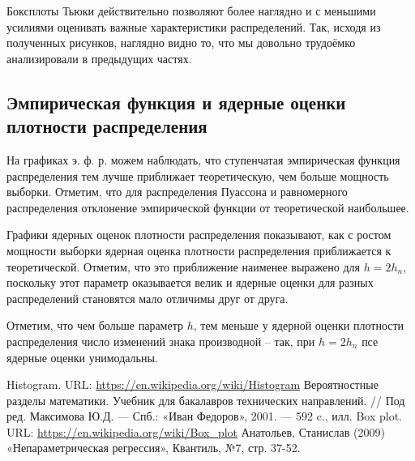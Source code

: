 \documentclass[12pt]{article}
\begin{document}
	Боксплоты Тьюки действительно позволяют более наглядно и с меньшими усилиями оценивать важные характеристики распределений. Так, исходя из полученных рисунков, наглядно видно то, что мы довольно трудоёмко анализировали в предыдущих частях.

	
	\subsection{Эмпирическая функция и ядерные оценки плотности распределения}
	
	На графиках э. ф. р. можем наблюдать, что ступенчатая эмпирическая функция распределения тем лучше приближает теоретическую, чем больше мощность выборки. Отметим, что для распределения Пуассона и равномерного распределения отклонение эмпирической функции от теоретической наибольшее.
	
	Графики ядерных оценок плотности распределения показывают, как с ростом мощности выборки ядерная оценка плотности распределения приближается к теоретической. Отметим, что это приближение наименее выражено для $h=2h_n$, поскольку этот параметр оказывается велик и ядерные оценки для разных распределений становятся мало отличимы друг от друга.
	
	Отметим, что чем больше параметр $h$, тем меньше у ядерной оценки плотности распределения число изменений знака производной -- так, при $h=2h_n$ псе ядерные оценки унимодальны.

	\newpage

	\renewcommand\refname{Литература}
	\begin{thebibliography}{10}
		 Histogram. URL: \url{https://en.wikipedia.org/wiki/Histogram}
		 Вероятностные разделы математики. Учебник для бакалавров технических направлений. // Под ред. Максимова Ю.Д. — Спб.: «Иван Федоров», 2001. — 592 c., илл.
		 Box plot. URL: \url{https://en.wikipedia.org/wiki/Box_plot}
		 Анатольев, Станислав (2009) «Непараметрическая регрессия», Квантиль, №7, стр. 37-52.
	\end{thebibliography}
	
\end{document}
